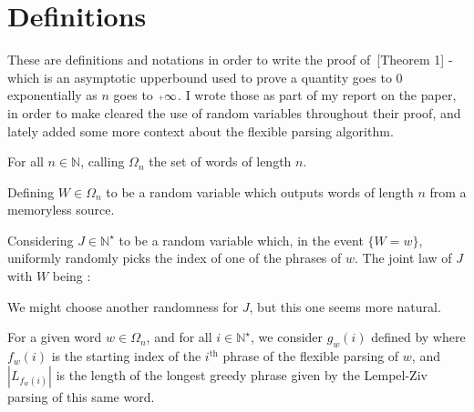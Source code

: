 \hypertarget{definitions}{\section{Definitions}}

\noindent
These are definitions and notations in order
to write the proof of~\cite{langiu_speed_2018}[Theorem 1] - which
is an asymptotic upperbound used to prove a quantity goes to 
0 exponentially as $n$ goes to $\pinf$. I wrote those as part 
of my report on the paper, in order to make cleared the use 
of random variables throughout their proof, and lately added some 
more context about the flexible parsing algorithm.


\begin{df}
For all $n\in\mathbb{N}$, calling $\Omega_n$ the set 
of words of length $n$.
\end{df}

\begin{df}
Defining $W \in \Omega_n$ to be a random variable which outputs 
words of length $n$ from a memoryless source.
\end{df}

\begin{df}
Considering $J \in \mathbb{N}^{\star}$ to be a random
variable which, in the event $\{ W = w \}$,
uniformly randomly picks the index of
one of the phrases of $w$.
The joint law of $J$ with $W$ being :

\end{df}

\begin{rmk}
We might choose another randomness for $J$, but this one seems
more natural.
\end{rmk}

\begin{df}
For a given word $w\in\Omega_n$, 
and for all $i\in\mathbb{N}^{\star}$, 
we consider $g_w(i)$ defined by
where $f_w(i)$ is the starting index
of the $i^{\text{th}}$ phrase of the flexible parsing of $w$,
and $|L_{f_w(i)}|$ is the length of the longest greedy phrase
given by the Lempel-Ziv parsing of this same word.
\end{df}

